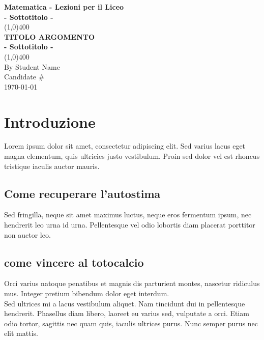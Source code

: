 \documentclass[11pt]{article}
\begin{document}
\begin{titlepage}
\begin{center}
\vspace*{1cm}
\Large{\textbf{Matematica - Lezioni per il Liceo}}\\
\large{\textbf{- Sottotitolo -}}\\
\vfill
\line(1,0){400}\\[.5mm]
\huge{\textbf{TITOLO ARGOMENTO}}\\[3mm]
\Large{\textbf{- Sottotitolo -}}\\[1mm]
\line(1,0){400}\\
\vfill
{\scriptsize By Student Name}\\
{\scriptsize Candidate \#} \\
{\scriptsize \today} \\

\end{center}
\end{titlepage}

\tableofcontents
\thispagestyle{empty}
\clearpage

\setcounter{page}{1}

\vspace*{1cm}
\section{Introduzione}
Lorem ipsum dolor sit amet, consectetur adipiscing elit. Sed varius lacus eget magna elementum, quis ultricies justo vestibulum. Proin sed dolor vel est rhoncus tristique iaculis auctor mauris. 

\subsection{Come recuperare l'autostima}
Sed fringilla, neque sit amet maximus luctus, neque eros fermentum ipsum, nec hendrerit leo urna id urna. Pellentesque vel odio lobortis diam placerat porttitor non auctor leo. 

\subsection{come vincere al totocalcio}
Orci varius natoque penatibus et magnis dis parturient montes, nascetur ridiculus mus. Integer pretium bibendum dolor eget interdum.\\
Sed ultrices mi a lacus vestibulum aliquet. Nam tincidunt dui in pellentesque hendrerit. Phasellus diam libero, laoreet eu varius sed, vulputate a orci. Etiam odio tortor, sagittis nec quam quis, iaculis ultrices purus. Nunc semper purus nec elit mattis.
\end{document}
